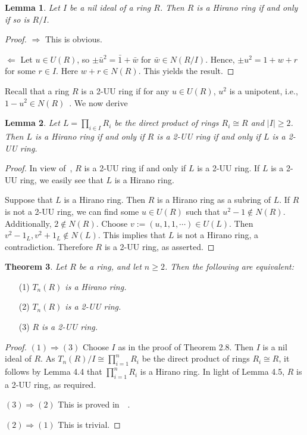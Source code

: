 \documentclass[12pt, reqno]{amsart}
\newtheorem{thm}{Theorem}[section]
\newtheorem{lem}[thm]{Lemma}
\numberwithin{equation}{section}
\begin{document}
\begin{lem} Let $I$ be a nil ideal of a ring $R$. Then $R$ is a Hirano ring if and only if so is $R/I$.\end{lem}
\begin{proof} $\Longrightarrow$ This is obvious.

$\Longleftarrow$ Let $u\in U(R)$, so $\pm \bar{u}^2=\bar{1}+\bar{w}$ for $\bar{w}\in N(R/I)$. Hence, $\pm u^2= 1+w+r$ for some $r\in I$. Here $w+r\in N(R)$.
This yields the result.\end{proof}

Recall that a ring $R$ is a 2-UU ring if for any $u\in U(R)$, $u^2$ is a unipotent, i.e., $1-u^2\in N(R)$~\cite{CS2}. We now derive

\begin{lem} Let
$L=\prod\limits_{i\in I}R_{i}$ be the direct product of rings
$R_i\cong R$ and $|I|\geq 2$. Then $L$ is a Hirano ring if and
only if $R$ is a 2-UU ring if and only if $L$ is a 2-UU ring.\end{lem}
\begin{proof} In view of~\cite[Theorem 2.1]{CS2}, $R$ is a 2-UU ring if and only if $L$ is a 2-UU ring. If $L$ is a 2-UU ring, we easily see that $L$ is a Hirano ring.

Suppose that $L$ is a Hirano ring. Then $R$ is a Hirano ring as a subring of $L$. If $R$ is not a 2-UU ring,
we can find some $u\in U(R)$ such that $u^2-1\not\in N(R)$. Additionally, $2\not\in N(R)$.
Choose $v:=(u,1,1,\cdots )\in U(L)$. Then $v^2-1_L, v^2+1_L\not\in N(L)$. This implies that
$L$ is not a Hirano ring, a contradiction. Therefore $R$ is a 2-UU ring, as asserted.\end{proof}

\begin{thm} Let $R$ be a ring, and let $n\geq 2$. Then the following are equivalent:
\end{thm}
\begin{enumerate}
\item [(1)] {\it $T_n(R)$ is a Hirano ring.}
\vspace{-.5mm}
\item [(2)] {\it $T_n(R)$ is a 2-UU ring.}
\vspace{-.5mm}
\item [(3)] {\it $R$ is a 2-UU ring.}
\end{enumerate}
\begin{proof} $(1)\Rightarrow (3)$ Choose $I$ as in the proof of Theorem 2.8. Then $I$ is a nil ideal of $R$. As $T_n(R)/I\cong \prod\limits_{i=1}^{n}R_{i}$ be the direct product of rings
$R_i\cong R$, it follows by Lemma 4.4 that $\prod\limits_{i=1}^{n}R_{i}$ is a Hirano ring. In light of Lemma 4.5, $R$ is a 2-UU ring, as required.

$(3)\Rightarrow (2)$ This is proved in~~\cite[Theorem 2.1]{CS2}.

$(2)\Rightarrow (1)$ This is trivial.\end{proof}
\end{document}
